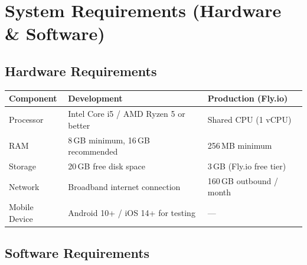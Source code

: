 \documentclass[12pt,a4paper]{article}
\begin{document}
\newpage
\section{System Requirements (Hardware \& Software)}

\subsection{Hardware Requirements}

\vspace{4pt}
\begin{center}
\renewcommand{\arraystretch}{1.35}
\begin{tabular}{@{} L{3.6cm} L{5.6cm} L{4cm} @{}}
\toprule
{}
\textbf{Component} & \textbf{Development} & \textbf{Production (Fly.io)} \\
\midrule
Processor     & Intel Core i5 / AMD Ryzen 5 or better & Shared CPU (1 vCPU) \\
RAM           & 8\,GB minimum, 16\,GB recommended     & 256\,MB minimum \\
Storage       & 20\,GB free disk space                & 3\,GB (Fly.io free tier) \\
Network       & Broadband internet connection          & 160\,GB outbound / month \\
Mobile Device & Android 10+ / iOS 14+ for testing     & --- \\
\bottomrule
\end{tabular}
\end{center}

\subsection{Software Requirements}
\end{document}

